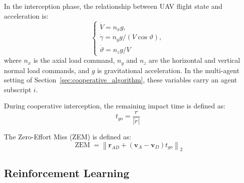\documentclass[lettersize,journal]{IEEEtran}
\providecommand{\DIFadd}[1]{{\protect\color{blue} #1}} %
\providecommand{\DIFdel}[1]{} %
\providecommand{\DIFaddbegin}{} %
\providecommand{\DIFaddend}{} %
\providecommand{\DIFdelbegin}{} %
\providecommand{\DIFdelend}{} %
\begin{document}
In the interception phase, the relationship between UAV flight state and acceleration is:
\DIFdelbegin %
\DIFdelend \DIFaddbegin \begin{equation}
\label{guozai}
\left\{\begin{matrix}
\dot{V}=n_xg,\\
\dot{\gamma}=n_yg/(V\cos\vartheta),\\
\dot{\vartheta}=n_zg/V
\end{matrix}\right.
\end{equation}\DIFaddend 
where \DIFdelbegin \DIFdel{$n_{x}$ }\DIFdelend \DIFaddbegin \DIFadd{\(n_x\) }\DIFaddend is the axial \DIFdelbegin \DIFdel{acceleration command, $n_{y}$ is the
normal acceleration command, and $g$ is the }\DIFdelend \DIFaddbegin \DIFadd{load command, \(n_y\) and \(n_z\) are the
horizontal and vertical normal load commands, and \(g\) is }\DIFaddend gravitational
acceleration.
In the multi-agent setting of Section~\ref{sec:cooperative_algorithm}, these variables carry
an agent subscript $i$.

During cooperative interception, the remaining impact time is defined as:
\begin{equation}
\label{shijian}
t_{go}=\frac{r}{\left|\dot{r}\right|}
\end{equation}

The Zero-Effort Miss (ZEM) is defined as:
\DIFdelbegin %
\DIFdelend \DIFaddbegin \begin{equation}
\label{ZEM}
\operatorname{ZEM}
=\left\|\mathbf r_{AD}
+(\mathbf v_A-\mathbf v_D)t_{go}\right\|_2
\end{equation}\DIFaddend 

\subsection{Reinforcement Learning}
\end{document}
